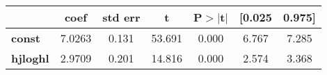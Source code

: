 \begin{center}
\begin{tabular}{lcccccc}
\toprule
                 & \textbf{coef} & \textbf{std err} & \textbf{t} & \textbf{P$> |$t$|$} & \textbf{[0.025} & \textbf{0.975]}  \\
\midrule
\textbf{const}   &       7.0263  &        0.131     &    53.691  &         0.000        &        6.767    &        7.285     \\
\textbf{hjloghl} &       2.9709  &        0.201     &    14.816  &         0.000        &        2.574    &        3.368     \\
\bottomrule
\end{tabular}
\end{center}